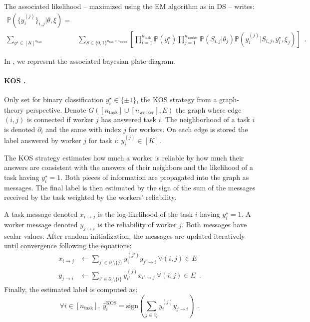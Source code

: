 The associated likelihood -- maximized using the EM algorithm as in DS -- writes:
\begin{align*}
\mathbb{P}(\{y_i^{(j)}\}_{i,j}|\theta,\xi) =& \\ \sum_{y^\star\in [K]^{n_\text{task}}}&\sum_{S\in\{0,1\}^{n_\text{task}\times n_\text{worker}}}\left[\prod_{i=1}^{n_\text{task}} \mathbb{P}(y^\star_i) \prod_{j=1}^{n_\text{worker}} \mathbb{P}(S_{i,j}|\theta_j)\mathbb{P}(y_i^{(j)}|S_{i,j},y_i^\star, \xi_j)\right]\enspace.
\end{align*}

In , we represent the associated bayesian plate diagram.

\paragraph{KOS \citep{karger2011iterative}.}
Only set for binary classification $y_i^\star\in\{\pm 1\}$, the KOS strategy from a graph-theory perspective.
Denote $G([n_\text{task}]\cup [n_\text{worker}], E)$ the graph where edge $(i,j)$ is connected if worker $j$ has answered task $i$. The neighborhood of a task $i$ is denoted $\partial_i$ and the same with index $j$ for workers.
On each edge is stored the label answered by worker $j$ for task $i$: $y_i^{(j)}\in[K]$.

The KOS strategy estimates how much a worker is reliable by how much their answers are consistent with the answers of their neighbors and the likelihood of a task having $y_i^\star=1$.
Both pieces of information are propagated into the graph as messages.
The final label is then estimated by the sign of the sum of the messages received by the task weighted by the workers' reliability.

A task message denoted $x_{i\rightarrow j}$ is the log-likelihood of the task $i$ having $y_i^\star=1$.
A worker message denoted $y_{j\rightarrow i}$ is the reliability of worker $j$.
Both messages have scalar values.
After random initialization, the messages are updated iteratively until convergence following the equations:
\begin{align*}
    x_{i\rightarrow j} &\gets \sum_{j'\in \partial_i\setminus \{j\}} y_i^{(j')}y_{j'\rightarrow i} \ \forall (i,j)\in E \\
    y_{j\rightarrow i} &\gets \sum_{i'\in \partial_j\setminus \{i\}} y_{i'}^{(j)} x_{i'\rightarrow j} \ \forall (i,j)\in E\enspace.
\end{align*}
Finally, the estimated label is computed as:
\[
\forall i\in [n_\text{task}],\ \hat y_i^{\text{KOS}} = \mathrm{sign}\left(\sum_{j\in\partial_i} y_i^{(j)}y_{j\rightarrow i}\right)\enspace.
\]

